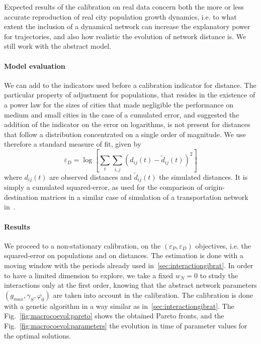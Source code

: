 Expected results of the calibration on real data concern both the more or less accurate reproduction of real city population growth dynamics, i.e. to what extent the inclusion of a dynamical network can increase the explanatory power for trajectories, and also how realistic the evolution of network distance is. We still work with the abstract model.


\paragraph{Model evaluation}


We can add to the indicators used before a calibration indicator for distance. The particular property of adjustment for populations, that resides in the existence of a power law for the sizes of cities that made negligible the performance on medium and small cities in the case of a cumulated error, and suggested the addition of the indicator on the error on logarithms, is not present for distances that follow a distribution concentrated on a single order of magnitude. We use therefore a standard measure of fit, given by
\[
\varepsilon_D = \log \left[ \sum_t \sum_{i,j} \left(d_{ij}(t) - \tilde{d}_{ij}(t)\right)^2\right]
\]
where $d_{ij}(t)$ are observed distances and $\tilde{d}_{ij}(t)$ the simulated distances. It is simply a cumulated squared-error, as used for the comparison of origin-destination matrices in a similar case of simulation of a transportation network in~\cite{jacobs2016transport}.


\paragraph{Results}

We proceed to a non-stationary calibration, on the $(\varepsilon_P,\varepsilon_D)$ objectives, i.e. the squared-error on populations and on distances. The estimation is done with a moving window with the periods already used in~\ref{sec:interactiongibrat}. In order to have a limited dimension to explore, we take a fixed $w_N = 0$ to study the interactions only at the first order, knowing that the abstract network parameters $(g_{max},\gamma_S,\varphi_0)$ are taken into account in the calibration. The calibration is done with a genetic algorithm in a way similar as in~\ref{sec:interactiongibrat}. The Fig.~\ref{fig:macrocoevol:pareto} shows the obtained Pareto fronts, and the Fig.~\ref{fig:macrocoevol:parameters} the evolution in time of parameter values for the optimal solutions.

